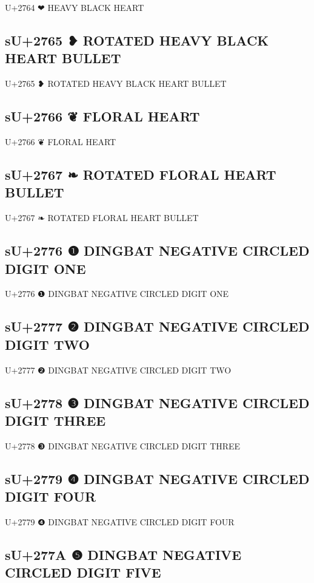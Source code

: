 U+2764 ❤ HEAVY BLACK HEART

\subsection{sU+2765 ❥ ROTATED HEAVY BLACK HEART BULLET}

U+2765 ❥ ROTATED HEAVY BLACK HEART BULLET

\subsection{sU+2766 ❦ FLORAL HEART}

U+2766 ❦ FLORAL HEART

\subsection{sU+2767 ❧ ROTATED FLORAL HEART BULLET}

U+2767 ❧ ROTATED FLORAL HEART BULLET

\subsection{sU+2776 ❶ DINGBAT NEGATIVE CIRCLED DIGIT ONE}

U+2776 ❶ DINGBAT NEGATIVE CIRCLED DIGIT ONE

\subsection{sU+2777 ❷ DINGBAT NEGATIVE CIRCLED DIGIT TWO}

U+2777 ❷ DINGBAT NEGATIVE CIRCLED DIGIT TWO

\subsection{sU+2778 ❸ DINGBAT NEGATIVE CIRCLED DIGIT THREE}

U+2778 ❸ DINGBAT NEGATIVE CIRCLED DIGIT THREE

\subsection{sU+2779 ❹ DINGBAT NEGATIVE CIRCLED DIGIT FOUR}

U+2779 ❹ DINGBAT NEGATIVE CIRCLED DIGIT FOUR

\subsection{sU+277A ❺ DINGBAT NEGATIVE CIRCLED DIGIT FIVE}

